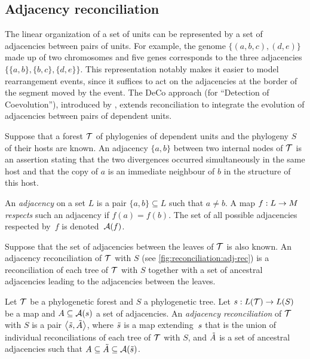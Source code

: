 \subsection{Adjacency reconciliation}

The linear organization of a set of units can be represented by a set of adjacencies between pairs of units.
For example, the genome \(\{(a, b, c), (d, e)\}\) made up of two chromosomes and five genes corresponds to the three adjacencies \(\{\{a, b\}, \{b, c\}, \{d, e\}\}\).
This representation notably makes it easier to model rearrangement events, since it suffices to act on the adjacencies at the border of the segment moved by the event.
The DeCo approach (for \enquote{Detection of Coevolution}), introduced by \textcite{Berard2012EvolutionGeneNeighborhoods}, extends reconciliation to integrate the evolution of adjacencies between pairs of dependent units.

Suppose that a forest \(\mathcal{T}\) of phylogenies of dependent units and the phylogeny \(S\) of their hosts are known.
An adjacency \(\{a, b\}\) between two internal nodes of \(\mathcal{T}\) is an assertion stating that the two divergences occurred simultaneously in the same host and that the copy of \(a\) is an immediate neighbour of \(b\) in the structure of this host.

\begin{definition}[Adjacencies]\label{definition:adj}
    An \emph{adjacency} on a set \(L\) is a pair \(\{a, b\} \subseteq L\) such that \(a \neq b\).
    A map \(f : L \rightarrow M\) \emph{respects} such an adjacency if \(f(a) = f(b)\).
    The set of all possible adjacencies respected by~\(f\) is denoted~\(\mathcal{A}(f)\).
\end{definition}

Suppose that the set of adjacencies between the leaves of \(\mathcal{T}\) is also known.
An adjacency reconciliation of \(\mathcal{T}\) with \(S\) (see \cref{fig:reconciliation:adj-rec}) is a reconciliation of each tree of \(\mathcal{T}\) with \(S\) together with a set of ancestral adjacencies leading to the adjacencies between the leaves.

\begin{definition}\label{definition:adjrec}
    Let \(\mathcal{T}\) be a phylogenetic forest and \(S\) a phylogenetic tree.
    Let \(s : L(\mathcal{T}) \rightarrow L(S)\) be a map and \(A \subseteq \mathcal{A}(s)\) a set of adjacencies.
    An \emph{adjacency reconciliation} of \(\mathcal{T}\) with \(S\) is a pair \(\left\langle\tilde{s}, \tilde{A}\right\rangle\),
    where \(\tilde{s}\) is a map extending~\(s\) that is the union of individual reconciliations of each tree of \(\mathcal{T}\) with \(S\),
    and \(\tilde{A}\) is a set of ancestral adjacencies such that \(A \subseteq \tilde{A} \subseteq \mathcal{A}(\tilde{s})\).
\end{definition}

